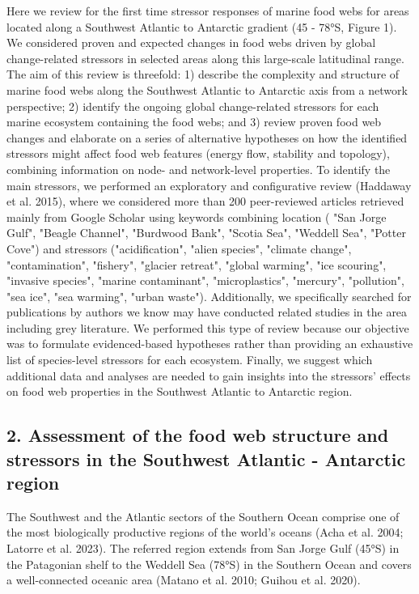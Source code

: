 \documentclass[
]{article}
\begin{document}
Here we review for the first time stressor responses of marine food webs
for areas located along a Southwest Atlantic to Antarctic gradient (45 -
78°S, Figure 1). We considered proven and expected changes in food webs
driven by global change-related stressors in selected areas along this
large-scale latitudinal range. The aim of this review is threefold: 1)
describe the complexity and structure of marine food webs along the
Southwest Atlantic to Antarctic axis from a network perspective; 2)
identify the ongoing global change-related stressors for each marine
ecosystem containing the food webs; and 3) review proven food web
changes and elaborate on a series of alternative hypotheses on how the
identified stressors might affect food web features (energy flow,
stability and topology), combining information on node- and
network-level properties. To identify the main stressors, we performed
an exploratory and configurative review 
(Haddaway et al. 2015), where we considered more than 200 peer-reviewed 
articles retrieved mainly from Google Scholar using keywords combining 
location ( "San Jorge Gulf", "Beagle Channel", "Burdwood Bank", "Scotia Sea", 
"Weddell Sea", "Potter Cove") and stressors ("acidification", "alien species", 
"climate change", "contamination", "fishery", "glacier retreat", "global warming", 
"ice scouring", "invasive species", "marine contaminant", "microplastics", "mercury", 
"pollution", "sea ice", "sea warming", "urban waste"). Additionally, we 
specifically searched for publications by authors we know may have conducted 
related studies in the area including grey literature. We performed this type of review because our 
objective was to formulate
evidenced-based hypotheses rather than providing an exhaustive list of
species-level stressors for each ecosystem. Finally, we suggest which
additional data and analyses are needed to gain insights into the
stressors' effects on food web properties in the Southwest Atlantic to
Antarctic region.

\subsection{2. Assessment of the food web structure and stressors in the
Southwest Atlantic - Antarctic
region}\label{assessment-of-the-food-web-structure-and-stressors-in-the-southwest-atlantic---antarctic-region}

The Southwest and the Atlantic sectors of the Southern Ocean comprise
one of the most biologically productive regions of the world's oceans
(Acha et al. 2004; Latorre et al. 2023). The referred region extends
from San Jorge Gulf (45°S) in the Patagonian shelf to the Weddell Sea
(78°S) in the Southern Ocean and covers a well-connected oceanic area
(Matano et al. 2010; Guihou et al. 2020).
\end{document}
